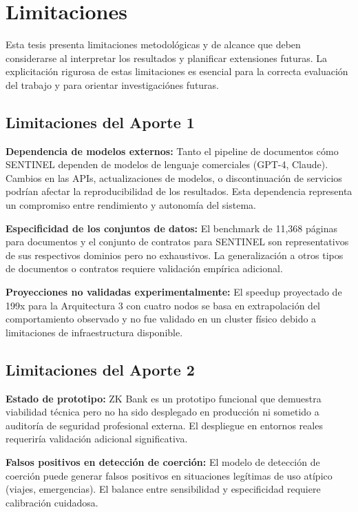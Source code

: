 \documentclass[12pt,a4paper,twoside]{book}
\begin{document}
\section{Limitaciones}

Esta tesis presenta limitaciones metodológicas y de alcance que deben considerarse al interpretar los resultados y planificar extensiones futuras. La explicitación rigurosa de estas limitaciones es esencial para la correcta evaluación del trabajo y para orientar investigaciónes futuras.

\subsection{Limitaciones del Aporte 1}

\textbf{Dependencia de modelos externos:} Tanto el pipeline de documentos cómo SENTINEL dependen de modelos de lenguaje comerciales (GPT-4, Claude). Cambios en las APIs, actualizaciones de modelos, o discontinuación de servicios podrían afectar la reproducibilidad de los resultados. Esta dependencia representa un compromiso entre rendimiento y autonomía del sistema.

\textbf{Especificidad de los conjuntos de datos:} El benchmark de 11,368 páginas para documentos y el conjunto de contratos para SENTINEL son representativos de sus respectivos dominios pero no exhaustivos. La generalización a otros tipos de documentos o contratos requiere validación empírica adicional.

\textbf{Proyecciones no validadas experimentalmente:} El speedup proyectado de 199x para la Arquitectura 3 con cuatro nodos se basa en extrapolación del comportamiento observado y no fue validado en un cluster físico debido a limitaciones de infraestructura disponible.

\subsection{Limitaciones del Aporte 2}

\textbf{Estado de prototipo:} ZK Bank es un prototipo funcional que demuestra viabilidad técnica pero no ha sido desplegado en producción ni sometido a auditoría de seguridad profesional externa. El despliegue en entornos reales requeriría validación adicional significativa.

\textbf{Falsos positivos en detección de coerción:} El modelo de detección de coerción puede generar falsos positivos en situaciones legítimas de uso atípico (viajes, emergencias). El balance entre sensibilidad y especificidad requiere calibración cuidadosa.
\end{document}
